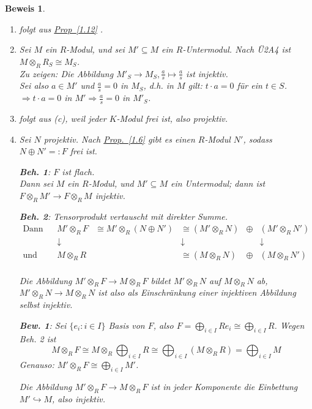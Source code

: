 \documentclass[a4paper,12pt]{scrbook}
\theoremstyle{break}
\theoremstyle{nonumberbreak}
\newtheorem{Bew}{Beweis}
\theoremstyle{nonumberplain}
\newcommand{\defeql}[0]{=\mathrel{\mathop:}}
\newcommand{\myref}[2]{%
\hyperref[#2]{#1~\ref*{#2}}%
}
\begin{document}
\begin{Bew}
\begin{enumerate}
\item[(b)] folgt aus \myref{Prop}{1.12}.
\item[(e)] Sei $M$ ein $R$-Modul, und sei $M'\subseteq M$ ein $R$-Untermodul.
Nach Ü2A4 ist $M\otimes_R R_S \cong M_S$.\\
Zu zeigen: Die Abbildung $M'_S\to M_S, \frac{a}{s}\mapsto \frac{a}{s}$ ist injektiv. \\
Sei also $a\in M'$ und $\frac{a}{s}=0$ in $M_S$, d.h. in $M$ gilt: $t\cdot a=0$ für ein $t\in S$.
$\Rightarrow t\cdot a = 0$ in $M'\Rightarrow \frac{a}{s}=0$ in $M'_S$.
\item[(d)] folgt aus (c), weil jeder $K$-Modul frei ist, also projektiv.
\item[(c)] Sei $N$ projektiv. Nach \myref{Prop.}{1.6} gibt es einen $R$-Modul
$N'$, sodass $N \oplus N'\defeql F$ frei ist.

\textbf{Beh. 1}: $F$ ist flach.\\
Dann sei $M$ ein $R$-Modul, und $M'\subseteq M$ ein Untermodul; dann ist $F\otimes_R M'\to F\otimes_R M$ injektiv.

\textbf{Beh. 2}: Tensorprodukt vertauscht mit direkter Summe.\\
$\begin{array}{lccccc}
\textrm{Dann ist }  &   M'\otimes_R F & \cong M'\otimes_R(N\oplus N')   &\cong (M'\otimes_R N)&\oplus &(M'\otimes_R N') \\
                    &   \downarrow &                                 &\downarrow               &   &\downarrow\\
  \textrm{und}       &   M\otimes_R R &                               &\cong (M\otimes_R N)&\oplus &(M\otimes_R N')\\
\end{array}$

Die Abbildung $M' \otimes_R F \to M \otimes_R F$ bildet $M'\otimes_R N$ auf $M\otimes_R N$ ab, 
$M'\otimes_R N\to M\otimes_R N$ ist also als Einschränkung einer injektiven Abbildung selbst injektiv.

\textbf{Bew. 1}: Sei $\{e_i:i\in I\}$ Basis  von $F$, also $F=\bigoplus_{i\in I} R e_i\cong \bigoplus_{i\in I} R$.
Wegen Beh. 2 ist $$M\otimes_R F\cong M\otimes_R \bigoplus_{i\in I}R\cong \bigoplus_{i\in I}(M\otimes_R R)=\bigoplus_{i\in I}M$$
Genauso: $M' \otimes_R F\cong \bigoplus_{i\in I}M'$.

Die Abbildung $M' \otimes_R F \to M\otimes_R F$ ist in jeder Komponente die Einbettung $M'\hookrightarrow M$, also injektiv.


\end{enumerate}
\end{Bew}
\end{document}
